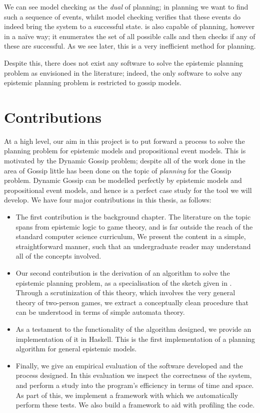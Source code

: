 \documentclass[10pt, a4paper]{report}
\begin{document}
We can see model checking as the \emph{dual} of planning; in planning we want
to find such a sequence of events, whilst model checking verifies that these
events do indeed bring the system to a successful state. \cite{GithubGossip} is
also capable of planning, however in a na{\"i}ve way; it enumerates the set of
all possible calls and then checks if any of these are successful. As we see
later, this is a very inefficient method for planning.  

Despite this, there does not exist any software to solve the epistemic planning
problem as envisioned in the literature; indeed, the only software to solve any
epistemic planning problem is restricted to gossip models.

\section{Contributions}

At a high level, our aim in this project is to put forward a process to solve
the planning problem for epistemic models and propositional event models. This
is motivated by the Dynamic Gossip problem; despite all of the work done in the
area of Gossip little has been done on the topic of \emph{planning} for the
Gossip problem. Dynamic Gossip can be modelled perfectly by epistemic models and
propositional event models, and hence is a perfect case study for the tool we
will develop. We have four major contributions in this thesis, as follows:

\begin{itemize}
  \setlength\itemsep{1em}
\item The first contribution is the background chapter. The literature on the
  topic spans from epistemic logic to game theory, and is far outside the reach
  of the standard computer science curriculum, We present the content in a
  simple, straightforward manner, such that an undergraduate reader may
  understand all of the concepts involved.
\item Our second contribution is the derivation of an algorithm to solve the
  epistemic planning problem, as a specialisation of the sketch given in
  \cite{AutomataTechniques}. Through a scrutinization of this theory, which
  involves the very general theory of two-person games, we extract a
  conceptually clean procedure that can be understood in terms of simple
  automata theory.
\item As a testament to the functionality of the algorithm designed, we provide
  an implementation of it in Haskell. This is the first implementation of a
  planning algorithm for general epistemic models. 
\item Finally, we give an empirical evaluation of the software developed and the
  process designed. In this evaluation we inspect the correctness of the system,
  and perform a study into the program's efficiency in terms of time and space.
  As part of this, we implement a framework with which we automatically perform
  these tests. We also build a framework to aid with profiling the code.
\end{itemize}
\end{document}
